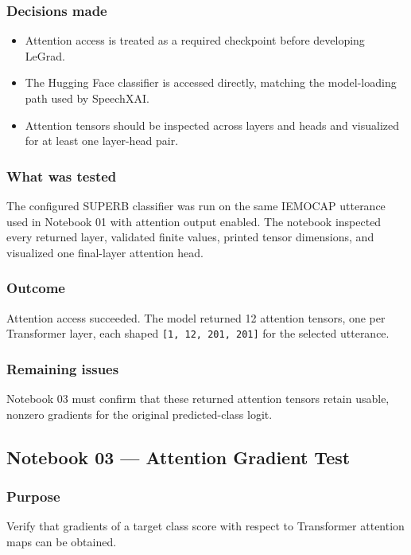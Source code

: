 \documentclass[11pt]{article}
\begin{document}
\subsubsection*{Decisions made}
\begin{itemize}
  \item Attention access is treated as a required checkpoint before developing LeGrad.
  \item The Hugging Face classifier is accessed directly, matching the model-loading path used by SpeechXAI.
  \item Attention tensors should be inspected across layers and heads and visualized for at least one layer-head pair.
\end{itemize}

\subsubsection*{What was tested}
The configured SUPERB classifier was run on the same IEMOCAP utterance used in Notebook 01 with attention output enabled. The notebook inspected every returned layer, validated finite values, printed tensor dimensions, and visualized one final-layer attention head.

\subsubsection*{Outcome}
Attention access succeeded. The model returned 12 attention tensors, one per Transformer layer, each shaped \texttt{[1, 12, 201, 201]} for the selected utterance.

\subsubsection*{Remaining issues}
Notebook 03 must confirm that these returned attention tensors retain usable, nonzero gradients for the original predicted-class logit.

\subsection{Notebook 03 --- Attention Gradient Test}

\subsubsection*{Purpose}
Verify that gradients of a target class score with respect to Transformer attention maps can be obtained.
\end{document}
